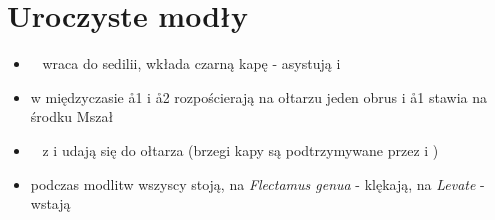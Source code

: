 \section{Uroczyste modły}

\begin{itemize}
    \item \ii~ wraca do sedilii, wkłada czarną kapę - asystują  i 
    \item w międzyczasie \aa1 i \aa2 rozpościerają na ołtarzu jeden obrus i \aa1
          stawia na środku Mszał
    \item \ii~ z  i  udają się do ołtarza (brzegi kapy są podtrzymywane
          przez  i )
    \item podczas modlitw wszyscy stoją, na \textit{Flectamus genua} - klękają,
          na \textit{Levate} - wstają
\end{itemize}